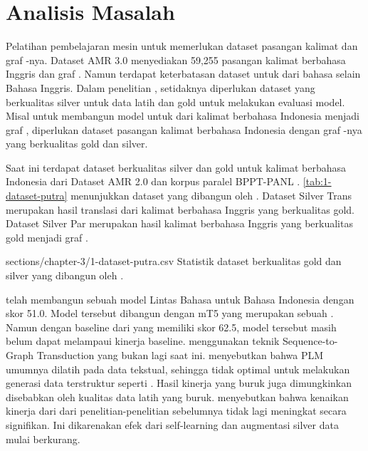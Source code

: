 \section{Analisis Masalah}

Pelatihan pembelajaran mesin untuk  \amrparsing{} memerlukan dataset  pasangan kalimat dan graf \AMR{}-nya.
Dataset AMR 3.0 menyediakan 59,255 pasangan kalimat berbahasa Inggris dan graf \AMR{}.
Namun terdapat keterbatasan dataset untuk  \amrparsing{} dari bahasa selain Bahasa Inggris.
Dalam penelitian \textcite{blloshmi2020}, setidaknya diperlukan dataset yang berkualitas silver untuk data latih dan gold untuk melakukan evaluasi model.
Misal untuk membangun model untuk \amrparsing{} dari kalimat berbahasa Indonesia menjadi graf \AMR{}, diperlukan dataset pasangan kalimat berbahasa Indonesia dengan graf \AMR{}-nya yang berkualitas gold dan silver.

Saat ini terdapat dataset berkualitas silver dan gold untuk kalimat berbahasa Indonesia dari Dataset AMR 2.0 dan korpus paralel BPPT-PANL .
\cref{tab:1-dataset-putra} menunjukkan dataset yang dibangun oleh \textcite{putra2022}.
Dataset Silver Trans merupakan hasil translasi dari kalimat berbahasa Inggris yang berkualitas gold.
Dataset Silver Par merupakan hasil  kalimat berbahasa Inggris yang berkualitas gold menjadi graf \AMR{}.

  {sections/chapter-3/1-dataset-putra.csv}
  {Statistik dataset berkualitas gold dan silver yang dibangun oleh \textcite{putra2022}.}

\textcite{putra2022} telah membangun sebuah model \AMR{}  Lintas Bahasa untuk Bahasa Indonesia dengan skor \SMATCH{} 51.0.
Model tersebut dibangun dengan \mwordem{} mT5 yang merupakan sebuah .
Namun dengan baseline dari  yang memiliki skor \SMATCH{} 62.5, model tersebut masih belum dapat melampaui kinerja baseline.
\textcite{putra2022} menggunakan teknik Sequence-to-Graph Transduction  yang bukan lagi  \amrparsing{} saat ini.
\textcite{bai2022} menyebutkan bahwa \gls{PLM} umumnya dilatih pada data tekstual, sehingga tidak optimal untuk melakukan generasi data terstruktur seperti \AMR{}.
Hasil kinerja yang buruk juga dimungkinkan disebabkan oleh kualitas data latih yang buruk.
\textcite{lee2022} menyebutkan bahwa kenaikan kinerja dari \amrparsing{} dari penelitian-penelitian sebelumnya tidak lagi meningkat secara signifikan.
Ini dikarenakan efek dari self-learning dan augmentasi silver data mulai berkurang.
